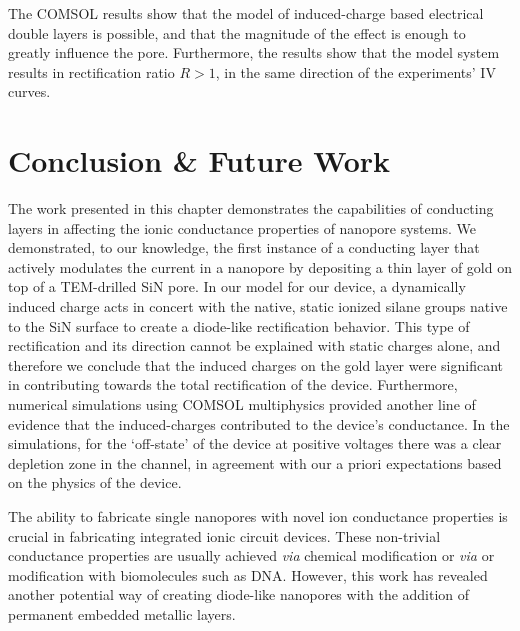 		The COMSOL results show that the model of induced-charge based electrical double layers is possible, and that the magnitude of the effect is enough to greatly influence the pore. Furthermore, the results show that the model system results in rectification ratio $R>1$, in the same direction of the experiments' IV curves.
		
	\section{Conclusion \& Future Work}
		
		The work presented in this chapter demonstrates the capabilities of conducting layers in affecting the ionic conductance properties of nanopore systems. We demonstrated, to our knowledge, the first instance of a conducting layer that actively modulates the current in a nanopore by depositing a thin layer of gold on top of a TEM-drilled SiN pore. In our model for our device, a dynamically induced charge acts in concert with the native, static ionized silane groups native to the SiN surface to create a diode-like rectification behavior. This type of rectification and its direction cannot be explained with static charges alone, and therefore we conclude that the induced charges on the gold layer were significant in contributing towards the total rectification of the device. Furthermore, numerical simulations using COMSOL multiphysics provided another line of evidence that the induced-charges contributed to the device's conductance. In the simulations, for the `off-state' of the device at positive voltages there was a clear depletion zone in the channel, in agreement with our a priori expectations based on the physics of the device. 
		
		The ability to fabricate single nanopores with novel ion conductance properties is crucial in fabricating integrated ionic circuit devices. These non-trivial conductance properties are usually achieved \textit{via} chemical modification or \textit{via} or modification with biomolecules such as DNA. However, this work has revealed another potential way of creating diode-like nanopores with the addition of permanent embedded metallic layers. 
		
		
		
			
			
		
			
		
			
	
		
		
		
		
	

	





